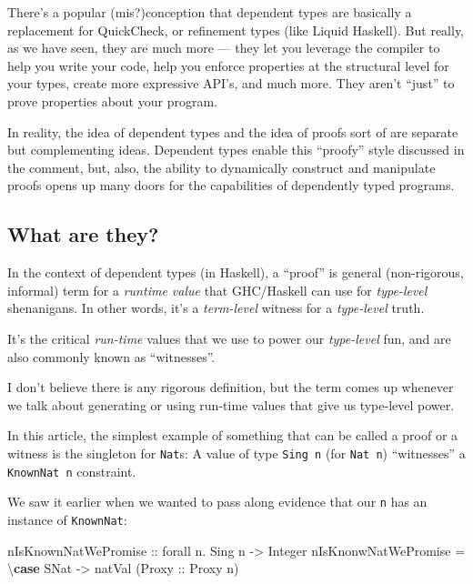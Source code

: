 \documentclass[]{article}
\newenvironment{Shaded}{}{}
\newcommand{\DataTypeTok}[1]{\textcolor[rgb]{0.56,0.13,0.00}{#1}}
\newcommand{\FunctionTok}[1]{\textcolor[rgb]{0.02,0.16,0.49}{#1}}
\newcommand{\KeywordTok}[1]{\textcolor[rgb]{0.00,0.44,0.13}{\textbf{#1}}}
\newcommand{\NormalTok}[1]{#1}
\newcommand{\OtherTok}[1]{\textcolor[rgb]{0.00,0.44,0.13}{#1}}
\begin{document}
There's a popular (mis?)conception that dependent types are basically a
replacement for QuickCheck, or refinement types (like Liquid Haskell). But
really, as we have seen, they are much more --- they let you leverage the
compiler to help you write your code, help you enforce properties at the
structural level for your types, create more expressive API's, and much more.
They aren't ``just'' to prove properties about your program.

In reality, the idea of dependent types and the idea of proofs sort of are
separate but complementing ideas. Dependent types enable this ``proofy'' style
discussed in the comment, but, also, the ability to dynamically construct and
manipulate proofs opens up many doors for the capabilities of dependently typed
programs.

\hypertarget{what-are-they}{%
\subsection{What are they?}\label{what-are-they}}

In the context of dependent types (in Haskell), a ``proof'' is general
(non-rigorous, informal) term for a \emph{runtime value} that GHC/Haskell can
use for \emph{type-level} shenanigans. In other words, it's a \emph{term-level}
witness for a \emph{type-level} truth.

It's the critical \emph{run-time} values that we use to power our
\emph{type-level} fun, and are also commonly known as ``witnesses''.

I don't believe there is any rigorous definition, but the term comes up whenever
we talk about generating or using run-time values that give us type-level power.

In this article, the simplest example of something that can be called a proof or
a witness is the singleton for \texttt{Nat}s: A value of type \texttt{Sing\ n}
(for \texttt{Nat\ n}) ``witnesses'' a \texttt{KnownNat\ n} constraint.

We saw it earlier when we wanted to pass along evidence that our \texttt{n} has
an instance of \texttt{KnownNat}:

\begin{Shaded}
\begin{Highlighting}[]
\OtherTok{nIsKnownNatWePromise ::}\NormalTok{ forall n}\FunctionTok{.} \DataTypeTok{Sing}\NormalTok{ n }\OtherTok{->} \DataTypeTok{Integer}
\NormalTok{nIsKnonwNatWePromise }\FunctionTok{=}\NormalTok{ \textbackslash{}}\KeywordTok{case}
    \DataTypeTok{SNat} \OtherTok{->}\NormalTok{ natVal (}\DataTypeTok{Proxy}\OtherTok{ ::} \DataTypeTok{Proxy}\NormalTok{ n)}
\end{Highlighting}
\end{Shaded}
\end{document}
